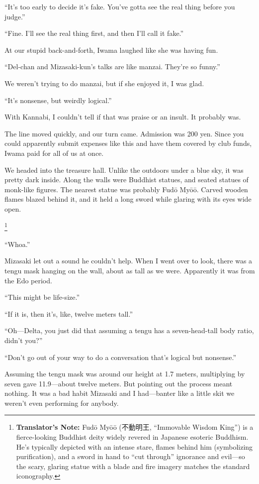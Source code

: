 \documentclass[
    a4paper,
    12pt,
    twoside,
    openany,
    UTF8,
    fontset=windows
]{ctexbook}
\begin{document}
``It's too early to decide it's fake. You've gotta see the real thing before you judge.''

``Fine. I'll see the real thing first, and then I'll call it fake.''

At our stupid back-and-forth, Iwama laughed like she was having fun.

``Del-chan and Mizasaki-kun's talks are like manzai. They're so funny.''

We weren't trying to do manzai, but if she enjoyed it, I was glad.

``It's nonsense, but weirdly logical.''

With Kannabi, I couldn't tell if that was praise or an insult. It probably was.

The line moved quickly, and our turn came. Admission was 200 yen. Since you could apparently submit expenses like this and have them covered by club funds, Iwama paid for all of us at once.

We headed into the treasure hall. Unlike the outdoors under a blue sky, it was pretty dark inside. Along the walls were Buddhist statues, and seated statues of monk-like figures. The nearest statue was probably Fud\=o My\=o\=o. Carved wooden flames blazed behind it, and it held a long sword while glaring with its eyes wide open.

\footnote{\textbf{Translator's Note:} Fud\=o My\=o\=o (不動明王, ``Immovable Wisdom King'') is a fierce-looking Buddhist deity widely revered in Japanese esoteric Buddhism. He's typically depicted with an intense stare, flames behind him (symbolizing purification), and a sword in hand to ``cut through'' ignorance and evil---so the scary, glaring statue with a blade and fire imagery matches the standard iconography.}

``Whoa.''

Mizasaki let out a sound he couldn't help. When I went over to look, there was a tengu mask hanging on the wall, about as tall as we were. Apparently it was from the Edo period.

``This might be life-size.''

``If it is, then it's, like, twelve meters tall.''

``Oh---Delta, you just did that assuming a tengu has a seven-head-tall body ratio, didn't you?''

``Don't go out of your way to do a conversation that's logical but nonsense.''

Assuming the tengu mask was around our height at 1.7 meters, multiplying by seven gave 11.9---about twelve meters. But pointing out the process meant nothing. It was a bad habit Mizasaki and I had---banter like a little skit we weren't even performing for anybody.
\end{document}
